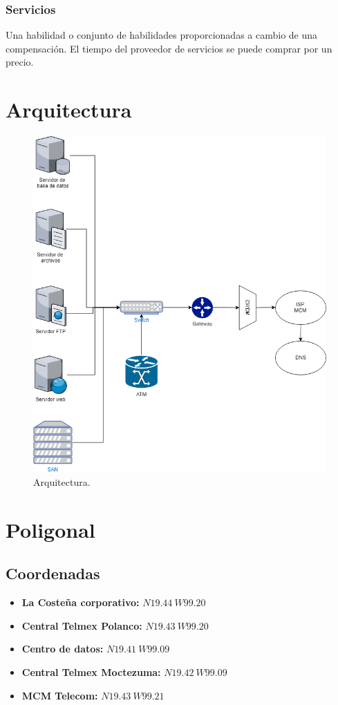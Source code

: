 \documentclass[12pt,letterpaper]{article}
\begin{document}
\subsubsection{Servicios}
Una habilidad o conjunto de habilidades proporcionadas a cambio de una compensación. El 
tiempo del proveedor de servicios se puede comprar por un precio.

\newpage
\section{Arquitectura}
\begin{figure}[ht]
    \centering
    \includegraphics[width=.75\textwidth]{f16.png}
    \caption{Arquitectura.}
\end{figure}


\newpage
\section{Poligonal}
\subsection{Coordenadas}
\begin{itemize}
    \item \textbf{La Costeña corporativo:} $N 19.44 \ W 99.20$
    \item \textbf{Central Telmex Polanco:} $N 19.43 \ W 99.20$
    \item \textbf{Centro de datos:} $N 19.41 \ W 99.09$
    \item \textbf{Central Telmex Moctezuma:} $N 19.42 \ W 99.09$
    \item \textbf{MCM Telecom:} $N 19.43 \ W 99.21$
\end{itemize}
\end{document}
